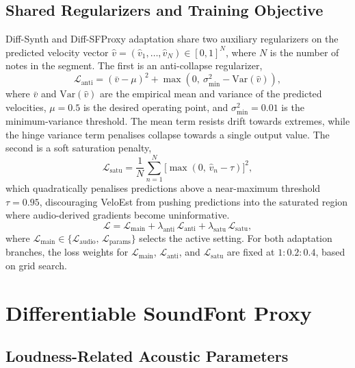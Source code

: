 \documentclass{article}
\begin{document}
\subsection{Shared Regularizers and Training Objective}
\label{sec:training_objective}
Diff-Synth and Diff-SFProxy adaptation share two auxiliary regularizers on the predicted velocity vector $\hat{v}=(\hat{v}_1,\ldots,\hat{v}_N)\in[0,1]^N$, where $N$ is the number of notes in the segment. The first is an anti-collapse regularizer,
\begin{equation}
\label{eq:anti_loss}
    \mathcal{L}_{\mathrm{anti}}
    = (\bar{v} - \mu)^2
    + \max\!\left(0,\ \sigma_{\min}^2 - \mathrm{Var}(\hat{v})\right),
\end{equation}
where $\bar{v}$ and $\mathrm{Var}(\hat{v})$ are the empirical mean and variance of the predicted velocities, $\mu = 0.5$ is the desired operating point, and $\sigma_{\min}^2 = 0.01$ is the minimum-variance threshold. The mean term resists drift towards extremes, while the hinge variance term penalises collapse towards a single output value. The second is a soft saturation penalty,
\begin{equation}
\label{eq:satu_loss}
    \mathcal{L}_{\mathrm{satu}}
    = \frac{1}{N}\sum_{n=1}^{N}
    \bigl[\max(0,\, \hat{v}_n - \tau)\bigr]^2,
\end{equation}
which quadratically penalises predictions above a near-maximum threshold $\tau = 0.95$, discouraging VeloEst from pushing predictions into the saturated region where audio-derived gradients become uninformative.
\begin{equation}
\label{eq:total_vel_loss}
    \mathcal{L}
    = \mathcal{L}_{\mathrm{main}}
    + \lambda_{\mathrm{anti}}\,\mathcal{L}_{\mathrm{anti}}
    + \lambda_{\mathrm{satu}}\,\mathcal{L}_{\mathrm{satu}},
\end{equation}
where $\mathcal{L}_{\mathrm{main}} \in \{\mathcal{L}_{\mathrm{audio}},\,\mathcal{L}_{\mathrm{params}}\}$ selects the active setting. For both adaptation branches, the loss weights for $\mathcal{L}_{\mathrm{main}}$, $\mathcal{L}_{\mathrm{anti}}$, and $\mathcal{L}_{\mathrm{satu}}$ are fixed at $1{:}0.2{:}0.4$, based on grid search.
 
 
\section{Differentiable SoundFont Proxy}
\label{sec:diffproxy}


\subsection{Loudness-Related Acoustic Parameters}
\label{sec:acoustic_params}
\end{document}
